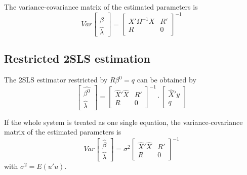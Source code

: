 The variance-covariance matrix of the estimated parameters is
\begin{equation}
   Var 
   \left[ \begin{array}{c}
      \widehat{\beta} \\ \widehat{\lambda}
   \end{array} \right] 
   = 
   \left[ \begin{array}{cc}
      X' \Omega^{-1} X & R' \\ 
      R & 0
   \end{array} \right]^{-1}
\end{equation}

\subsection{Restricted 2SLS estimation}

The 2SLS estimator restricted by $R \beta^0 = q$ can be obtained by
\begin{equation}
   \left[ \begin{array}{c}
      \widehat{\beta^0} \\ \widehat{\lambda}
   \end{array} \right]
   =
   \left[ \begin{array}{cc}
      \widehat{X}' \widehat{X} & R' \\ 
      R & 0
   \end{array} \right]^{-1}
   \cdot
   \left[ \begin{array}{c}
      \widehat{X}' y \\ q 
   \end{array} \right]
   \label{eq:beta2SLSr}
\end{equation}

If the whole system is treated as one single equation, 
the variance-covariance matrix of the estimated parameters is
\begin{equation}
   Var 
   \left[ \begin{array}{c}
      \widehat{\beta} \\ \widehat{\lambda}
   \end{array} \right] 
   = \sigma^2 
   \left[ \begin{array}{cc}
      \widehat{X}' \widehat{X} & R' \\ 
      R & 0
   \end{array} \right]^{-1}
\end{equation}
with $\sigma^2 = E \left( u' u \right)$.

